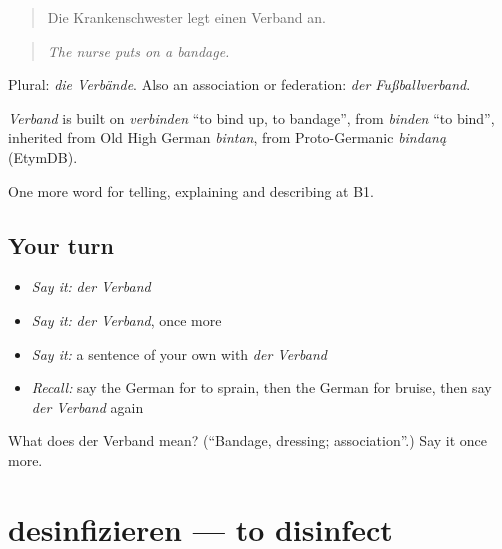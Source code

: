 \begin{quote}
Die Krankenschwester legt einen Verband an.
\end{quote}

\begin{quote}
\emph{The nurse puts on a bandage.}
\end{quote}

Plural: \emph{die Verbände}. Also an association or federation: \emph{der Fußballverband}.

\begin{cousinweb}
\emph{Verband} is built on \emph{verbinden} \textquotedblleft{}to bind up, to bandage\textquotedblright{}, from \emph{binden} \textquotedblleft{}to bind\textquotedblright{}, inherited from Old High German \emph{bintan}, from Proto-Germanic \emph{bindaną} (EtymDB).
\end{cousinweb}

\begin{grammarlens}[title={What you've built}]
One more word for telling, explaining and describing at B1.
\end{grammarlens}

\subsection*{Your turn}
\begin{itemize}
\raggedright
  \item \emph{Say it:} \emph{der Verband}
  \item \emph{Say it:} \emph{der Verband}, once more
  \item \emph{Say it:} a sentence of your own with \emph{der Verband}
  \item \emph{Recall:} say the German for to sprain, then the German for bruise, then say \emph{der Verband} again
\end{itemize}

\begin{tcolorbox}[breakable,colback=teal!4,colframe=teal!35!black,title={Before you move on}]
What does der Verband mean? (\textquotedblleft{}Bandage, dressing; association\textquotedblright{}.) Say it once more.
\end{tcolorbox}
\section[desinfizieren]{desinfizieren — to disinfect}

\label{lesson:GE-C482-desinfizieren}



